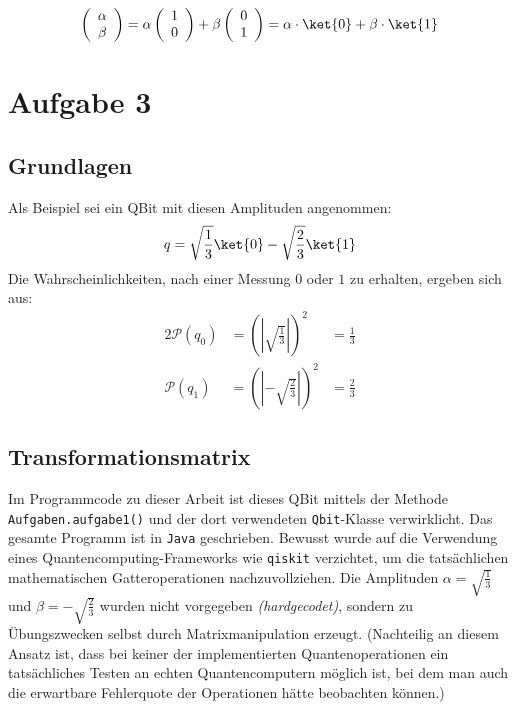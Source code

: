 \begin{align}
    \left(\begin{array}{c}
        \alpha\\
        \beta
    \end{array}\right) 
    =
    \alpha \left(\begin{array}{c}
        1\\
        0   
    \end{array}\right) 
    +
    \beta \left(\begin{array}{c}
        0\\
        1   
    \end{array}\right) 
    =
    \alpha \cdot \ket{0}+\beta \cdot \ket{1}
\end{align}

\chapter{Aufgabe 3}
\section{Grundlagen}
Als Beispiel sei ein QBit mit diesen Amplituden angenommen:
\begin{align}
q=\sqrt{\frac{1}{3}} \ket{0}-\sqrt{\frac{2}{3}} \ket{1} \label{qbitexamp}
\end{align}
Die Wahrscheinlichkeiten, nach einer Messung $0$ oder $1$ zu erhalten, ergeben sich aus:
\begin{alignat}{2}
\mathcal{P}(q_0) & = \left( \left\lvert \sqrt{\frac{1}{3}} \right\rvert \right) ^2 & = \frac{1}{3}\\
\mathcal{P}(q_1) & = \left( \left\lvert - \sqrt{\frac{2}{3}} \right\rvert \right)^2 & = \frac{2}{3}
\end{alignat}

\section{Transformationsmatrix}
Im Programmcode zu dieser Arbeit ist dieses QBit mittels der Methode \texttt{Aufgaben.aufgabe1()} und der dort verwendeten \texttt{Qbit}-Klasse verwirklicht.
Das gesamte Programm ist in \texttt{Java} geschrieben.
Bewusst wurde auf die Verwendung eines Quantencomputing-Frameworks wie \texttt{qiskit} verzichtet, um die tatsächlichen mathematischen Gatteroperationen nachzuvollziehen.
Die Amplituden $\alpha=\sqrt{\frac{1}{3}}$ und $\beta=-\sqrt{\frac{2}{3}}$ wurden nicht vorgegeben \textit{(hardgecodet)}, sondern zu Übungszwecken selbst durch Matrixmanipulation erzeugt.
(Nachteilig an diesem Ansatz ist, dass bei keiner der implementierten Quantenoperationen ein tatsächliches Testen an echten Quantencomputern möglich ist, bei dem man auch die erwartbare Fehlerquote der Operationen hätte beobachten können.)

